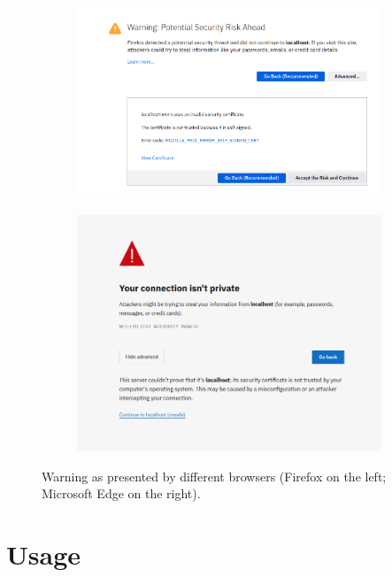 \documentclass[conference,onecolumn,a4paper]{IEEEtran}
\begin{document}
\begin{figure}[H]
    \centering
    \begin{subfigure}[b]{0.4\linewidth}
        \includegraphics[width=\linewidth]{resources/firefox-warning.png}
    \end{subfigure}
    \begin{subfigure}[b]{0.3\linewidth}
        \includegraphics[width=\linewidth]{resources/edge-warning.png}
    \end{subfigure}
    \caption{Warning as presented by different browsers (Firefox on the left; Microsoft Edge on the right).}
\end{figure}

\section{Usage}
\end{document}
